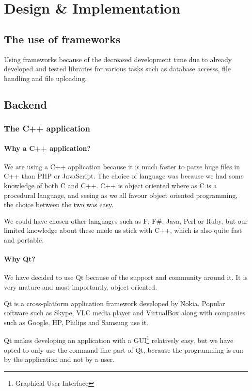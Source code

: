 \chapter{Design \& Implementation}
\section{The use of frameworks}
Using frameworks because of the decreased development time due to already developed and tested libraries for various tasks such as database accesss, file handling and file uploading.

\section{Backend}
\subsection{The C++ application}
\subsubsection{Why a C++ application?}
We are using a C++ application because it is much faster to parse huge files in C++ than PHP or JavaScript.
The choice of language was because we had some knowledge of both C and C++. C++ is object oriented where as C is a procedural language, and seeing as we all favour object oriented programming, the choice between the two was easy.

We could have chosen other languages such as F, F\#, Java, Perl or Ruby, but our limited knowledge about these made us stick with C++, which is also quite fast and portable.

\subsubsection{Why Qt?}
We have decided to use Qt because of the support and community around it. It is very mature and most importantly, object oriented.

Qt is a cross-platform application framework developed by Nokia. Popular software such as Skype, VLC media player and VirtualBox along with companies such as Google, HP, Philips and Samsung use it.

Qt makes developing an application with a GUI\footnote{Graphical User Interface} relatively easy, but we have opted to only use the command line part of Qt, because the programming is run by the application and not by a user.

